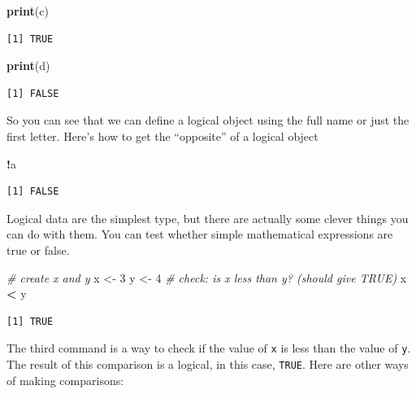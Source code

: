 \documentclass[
]{book}
\newenvironment{Shaded}{\begin{snugshade}}{\end{snugshade}}
\newcommand{\CommentTok}[1]{\textcolor[rgb]{0.56,0.35,0.01}{\textit{#1}}}
\newcommand{\DecValTok}[1]{\textcolor[rgb]{0.00,0.00,0.81}{#1}}
\newcommand{\KeywordTok}[1]{\textcolor[rgb]{0.13,0.29,0.53}{\textbf{#1}}}
\newcommand{\NormalTok}[1]{#1}
\newcommand{\OperatorTok}[1]{\textcolor[rgb]{0.81,0.36,0.00}{\textbf{#1}}}
\newcommand{\StringTok}[1]{\textcolor[rgb]{0.31,0.60,0.02}{#1}}
\begin{document}
\begin{Shaded}
\begin{Highlighting}[]
\KeywordTok{print}\NormalTok{(c)}
\end{Highlighting}
\end{Shaded}

\begin{verbatim}
[1] TRUE
\end{verbatim}

\begin{Shaded}
\begin{Highlighting}[]
\KeywordTok{print}\NormalTok{(d)}
\end{Highlighting}
\end{Shaded}

\begin{verbatim}
[1] FALSE
\end{verbatim}

So you can see that we can define a logical object using the full name or just the first letter.
Here's how to get the ``opposite'' of a logical object

\begin{Shaded}
\begin{Highlighting}[]
\OperatorTok{!}\NormalTok{a}
\end{Highlighting}
\end{Shaded}

\begin{verbatim}
[1] FALSE
\end{verbatim}

Logical data are the simplest type, but there are actually some clever things you can do with them.
You can test whether simple mathematical expressions are true or false.

\begin{Shaded}
\begin{Highlighting}[]
\CommentTok{# create x and y}
\NormalTok{x <-}\StringTok{ }\DecValTok{3}
\NormalTok{y <-}\StringTok{ }\DecValTok{4}
\CommentTok{# check: is x less than y? (should give TRUE)}
\NormalTok{x }\OperatorTok{<}\StringTok{ }\NormalTok{y}
\end{Highlighting}
\end{Shaded}

\begin{verbatim}
[1] TRUE
\end{verbatim}

The third command is a way to check if the value of \texttt{x} is less than the value of \texttt{y}.
The result of this comparison is a logical, in this case, \texttt{TRUE}.
Here are other ways of making comparisons:
\end{document}
